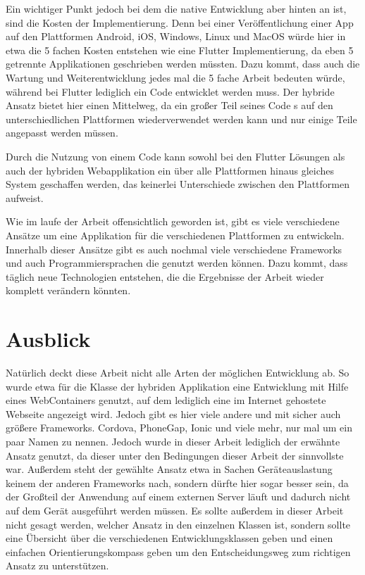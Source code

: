 Ein wichtiger Punkt jedoch bei dem die native Entwicklung aber hinten an ist, sind die Kosten der Implementierung. Denn bei einer Veröffentlichung einer App auf den Plattformen Android, iOS, Windows, Linux und MacOS würde hier in etwa die 5 fachen Kosten entstehen wie eine Flutter Implementierung, da eben 5 getrennte Applikationen geschrieben werden müssten. Dazu kommt, dass auch die Wartung und Weiterentwicklung jedes mal die 5 fache Arbeit bedeuten würde, während bei Flutter lediglich ein Code entwicklet werden muss. Der hybride Ansatz bietet hier einen Mittelweg, da ein großer Teil seines Code s auf den unterschiedlichen Plattformen wiederverwendet werden kann und nur einige Teile angepasst werden müssen. 

Durch die Nutzung von einem Code kann sowohl bei den Flutter Lösungen als auch der hybriden Webapplikation ein über alle Plattformen hinaus gleiches System geschaffen werden, das keinerlei Unterschiede zwischen den Plattformen aufweist. 

Wie im laufe der Arbeit offensichtlich geworden ist, gibt es viele verschiedene Ansätze um eine Applikation für die verschiedenen Plattformen zu entwickeln. Innerhalb dieser Ansätze gibt es auch nochmal viele verschiedene Frameworks und auch Programmiersprachen die genutzt werden können. Dazu kommt, dass täglich neue Technologien entstehen, die die Ergebnisse der Arbeit wieder komplett verändern könnten.

\section{Ausblick}
Natürlich deckt diese Arbeit nicht alle Arten der möglichen Entwicklung ab. So wurde etwa für die Klasse der hybriden Applikation eine Entwicklung mit Hilfe eines WebContainers genutzt, auf dem lediglich eine im Internet gehostete Webseite angezeigt wird. Jedoch gibt es hier viele andere und mit sicher auch größere Frameworks. Cordova, PhoneGap, Ionic und viele mehr, nur mal um ein paar Namen zu nennen. Jedoch wurde in dieser Arbeit lediglich der erwähnte Ansatz genutzt, da dieser unter den Bedingungen dieser Arbeit der sinnvollste war. Außerdem steht der gewählte Ansatz etwa in Sachen Geräteauslastung keinem der anderen Frameworks nach, sondern dürfte hier sogar besser sein, da der Großteil der Anwendung auf einem externen Server läuft und dadurch nicht auf dem Gerät ausgeführt werden müssen. Es sollte außerdem in dieser Arbeit nicht gesagt werden, welcher Ansatz in den einzelnen Klassen ist, sondern sollte eine Übersicht über die verschiedenen Entwicklungsklassen geben und einen einfachen Orientierungskompass geben um den Entscheidungsweg zum richtigen Ansatz zu unterstützen.

